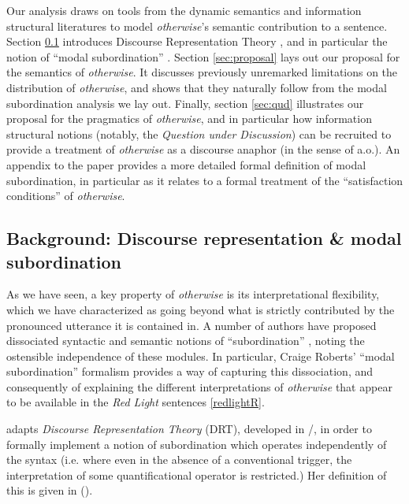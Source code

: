Our analysis draws on tools from the dynamic semantics and information structural literatures to model \textit{otherwise}'s semantic contribution to a sentence. Section \ref{sec:DRT} introduces Discourse Representation Theory \citep{Kamp1981, Heim}, and in particular the notion of ``modal subordination''	 \citep{Roberts1989, Roberts1995,Roberts1990, Roberts2004, Roberts2012}. Section \ref{sec:proposal} lays out our proposal for the semantics of \textit{otherwise}. It discusses previously unremarked limitations on the distribution of \textit{otherwise}, and shows that they naturally follow from the modal subordination analysis we lay out. Finally, section \ref{sec:qud} illustrates our proposal for the pragmatics of \textit{otherwise}, and in particular how information structural notions (notably, the \textit{Question under Discussion}) can be recruited to provide a treatment of \textit{otherwise} as a discourse anaphor (in the sense of \citealt{Webber2001} a.o.). An appendix to the paper provides a more detailed formal definition of modal subordination, in particular as it relates to a formal treatment of the ``satisfaction conditions'' of \textit{otherwise}.


\subsection{Background: Discourse representation \& modal subordination}
\label{sec:DRT}


As we have seen, a key property of \textit{otherwise} is its interpretational flexibility, which we have characterized as going beyond what is strictly contributed by the pronounced utterance it is contained in. A number of authors have proposed dissociated syntactic and semantic notions of ``subordination'' \citep[e.g.][]{Yuasa2002, DeVos2007, Culicover1997}, noting the ostensible independence of these modules. In particular, Craige Roberts' \citeyearpar{Roberts1989} ``modal subordination'' formalism provides a way of capturing this dissociation, and consequently of explaining the different interpretations of \textit{otherwise} that appear to be available in the \textit{Red Light} sentences \ref{redlightR}. 

\citet{Roberts1989} adapts  \textit{Discourse Representation Theory} (DRT), developed in \citealt{Kamp1981}/\citealt{Heim}, in order to formally implement a notion of subordination which operates independently of the syntax (i.e. where even in the absence of a conventional trigger, the interpretation of some quantificational operator is restricted.) Her definition of this is given in (\nextx).

